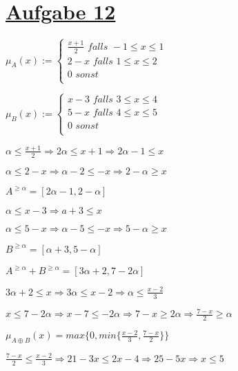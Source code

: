 \section*{\underline{Aufgabe 12}}


$
\mu_A(x) := \begin{cases} 
	\frac{x+1}{2} \textit{ falls }  -1 \leq x \leq 1  \\
	2-x           \textit{ falls }  1 \leq x \leq 2 \\
	0			  \textit{ sonst}	\\
\end{cases} 
$

$
\mu_B(x) := \begin{cases} 
	x-3 \textit{ falls }  3 \leq x \leq 4  \\
	5-x           \textit{ falls }  4 \leq x \leq 5 \\
	0			  \textit{ sonst}	\\
\end{cases} 
$

\hfill

$\alpha \leq \frac{x+1}{2} \Rightarrow 2\alpha \leq x+1 \Rightarrow 2\alpha-1 \leq x$

$\alpha \leq 2-x \Rightarrow \alpha -2 \leq -x \Rightarrow 2-\alpha \geq x$

$A^{\geq\alpha} = [2\alpha-1,2-\alpha]$

\hfill

$\alpha \leq x-3 \Rightarrow a+3 \leq x$

$\alpha \leq 5-x \Rightarrow \alpha-5 \leq -x \Rightarrow 5-\alpha \geq x $

$B^{\geq\alpha} = [\alpha+3 ,5-\alpha]$

\hfill

$A^{\geq\alpha}+B^{\geq\alpha} = [3\alpha+2,7-2\alpha]$

\hfill

$3\alpha+2 \leq x \Rightarrow 3\alpha \leq x-2 \Rightarrow \alpha \leq \frac{x-2}{3}$

$x \leq 7-2\alpha \Rightarrow x-7 \leq -2 \alpha \Rightarrow 7-x \geq 2\alpha \Rightarrow \frac{7-x}{2} \geq \alpha$

$\mu_{A\oplus B}(x) = max\{0,min\{\frac{x-2}{3},\frac{7-x}{2}\}\}$

\hfill

$\frac{7-x}{2} \leq \frac{x-2}{3} \Rightarrow 21 -3x \leq 2x-4 \Rightarrow 25 -5x \Rightarrow x \leq 5$

